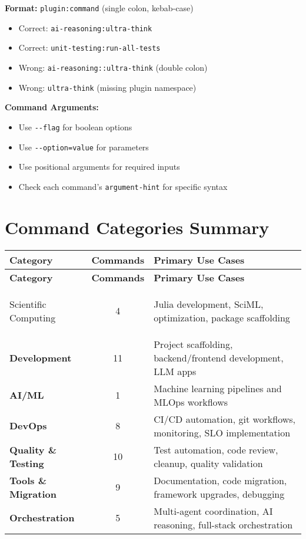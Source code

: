 \documentclass[11pt,a4paper]{article}
\begin{document}
\begin{tcolorbox}[colback=tableheader,colframe=primarycolor,arc=2mm]
\textbf{Format:} \texttt{plugin:command} (single colon, kebab-case)

\begin{itemize}[leftmargin=2cm]
    \item[\color{green}\Large\checkmark] Correct: \texttt{ai-reasoning:ultra-think}
    \item[\color{green}\Large\checkmark] Correct: \texttt{unit-testing:run-all-tests}
    \item[\color{red}\Large\ding{55}] Wrong: \texttt{ai-reasoning::ultra-think} (double colon)
    \item[\color{red}\Large\ding{55}] Wrong: \texttt{ultra-think} (missing plugin namespace)
\end{itemize}

\vspace{0.5cm}

\textbf{Command Arguments:}
\begin{itemize}
    \item Use \texttt{-{}-flag} for boolean options
    \item Use \texttt{-{}-option=value} for parameters
    \item Use positional arguments for required inputs
    \item Check each command's \texttt{argument-hint} for specific syntax
\end{itemize}
\end{tcolorbox}

\section{Command Categories Summary}

\begin{longtable}{>{\bfseries}p{} c p{}}
\toprule
\textnormal{\textbf{Category}} & \textbf{Commands} & \textbf{Primary Use Cases} \\
\midrule
\endfirsthead
\toprule
\textnormal{\textbf{Category}} & \textbf{Commands} & \textbf{Primary Use Cases} \\
\midrule
\endhead
\bottomrule
\endlastfoot

Scientific Computing & 4 & Julia development, SciML, optimization, package scaffolding \\
Development & 11 & Project scaffolding, backend/frontend development, LLM apps \\
AI/ML & 1 & Machine learning pipelines and MLOps workflows \\
DevOps & 8 & CI/CD automation, git workflows, monitoring, SLO implementation \\
Quality \& Testing & 10 & Test automation, code review, cleanup, quality validation \\
Tools \& Migration & 9 & Documentation, code migration, framework upgrades, debugging \\
Orchestration & 5 & Multi-agent coordination, AI reasoning, full-stack orchestration \\
\end{longtable}
\end{document}
